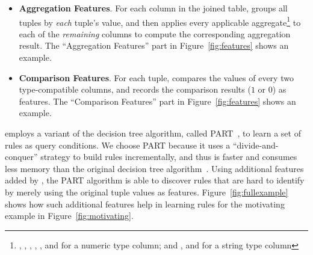 \begin{itemize}

\item {\textbf{Aggregation Features}}. For each
column in the joined table, \ourtool 
groups all tuples by \textit{each} tuple's
value, and then applies every applicable aggregate\footnote{
, , ,
, , and  for a numeric type column;
and , and  for
a string type column} to each of the
 \textit{remaining} columns to compute the corresponding aggregation result. 
The ``Aggregation Features'' part in Figure~\ref{fig:features}
shows an example.

\item {\textbf{Comparison Features}}. For each tuple,
\ourtool compares
the values of every two type-compatible columns, and records
the comparison results ($1$ or $0$) as features.
The ``Comparison Features'' part in Figure~\ref{fig:features}
shows an example.

\end{itemize}



\ourtool employs a variant of the decision tree algorithm,
called PART~\cite{Frank:1998}, to learn a set of rules
as query conditions. We choose PART
because it uses a ``divide-and-conquer'' strategy to 
build rules incrementally, and thus is faster
and consumes less memory than
the original decision tree algorithm~\cite{Quinlan:1986}.
Using additional features added by \ourtool, the
PART algorithm is able to discover rules that are
hard to identify by merely using the original tuple values as features.
Figure~\ref{fig:fullexample} shows how such additional features
help in learning rules for the motivating
example in Figure~\ref{fig:motivating}.




